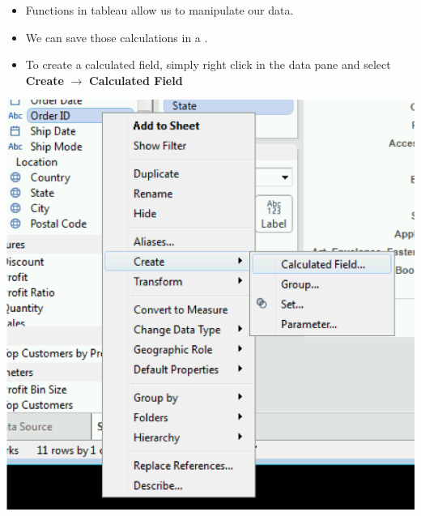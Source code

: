 \documentclass[xcolor=svgnames]{beamer} %
\begin{document}
%







\begin{frame}
\begin{itemize}
\item Functions in tableau allow us to manipulate our data.
\item We can save those calculations in a .
\item To create a calculated field, simply right click in the data pane and select {\bf Create} $\to$ {\bf Calculated Field}
\end{itemize}
\begin{center}
\includegraphics[width=.6\textwidth]{img/calc}
\end{center}
\end{frame}
\end{document}

